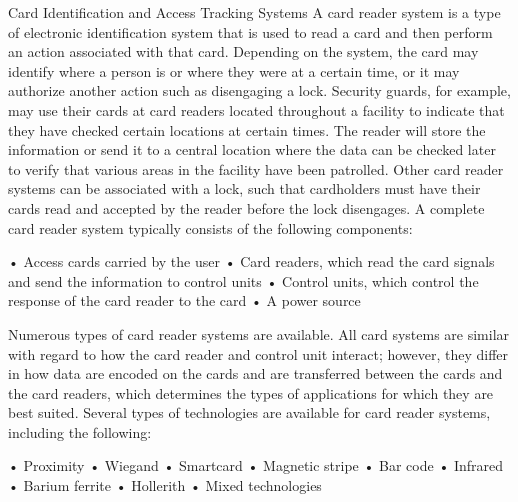 \documentclass{article}
\begin{document}
Card Identification and Access Tracking Systems A card reader system is
a type of electronic identification system that is used to read a card
and then perform an action associated with that card. Depending on the
system, the card may identify where a person is or where they were at a
certain time, or it may authorize another action such as disengaging a
lock. Security guards, for example, may use their cards at card readers
located throughout a facility to indicate that they have checked certain
locations at certain times. The reader will store the information or
send it to a central location where the data can be checked later to
verify that various areas in the facility have been patrolled. Other
card reader systems can be associated with a lock, such that cardholders
must have their cards read and accepted by the reader before the lock
disengages. A complete card reader system typically consists of the
following components:

• Access cards carried by the user • Card readers, which read the card
signals and send the information to control units • Control units, which
control the response of the card reader to the card • A power source

Numerous types of card reader systems are available. All card systems
are similar with regard to how the card reader and control unit
interact; however, they differ in how data are encoded on the cards and
are transferred between the cards and the card readers, which determines
the types of applications for which they are best suited. Several types
of technologies are available for card reader systems, including the
following:

• Proximity • Wiegand • Smartcard • Magnetic stripe • Bar code •
Infrared • Barium ferrite • Hollerith • Mixed technologies
\end{document}
